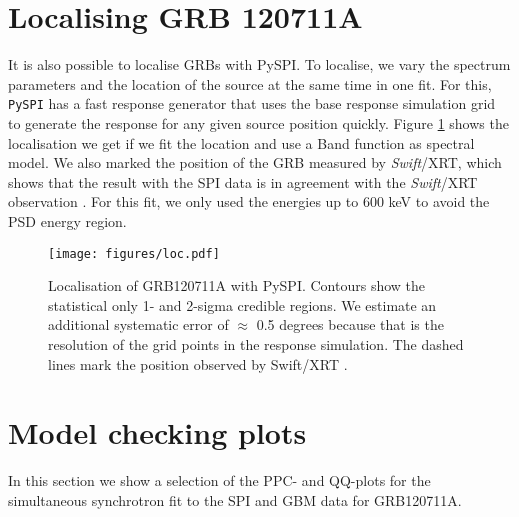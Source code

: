 \documentclass{aa}
\begin{document}
\begin{appendix}
  \section{Localising GRB 120711A}

  It is also possible to localise GRBs with PySPI. To localise, we vary the spectrum parameters and the location of the source at the same time in one fit. For this, {\tt PySPI} has a fast response generator that uses the base response simulation grid to generate the response for any given source position quickly. Figure \ref{fig:localization} shows the localisation we get if we fit the location and use a Band function as spectral model. We also marked the position of the GRB measured by \textit{Swift}/XRT, which shows that the result with the SPI data is in agreement with the \textit{Swift}/XRT observation \citep{GCN_swift}. For this fit, we only used the energies up to 600 keV to avoid the PSD energy region.

  \begin{figure}[ht]
  \begin{centering}
    \texttt{[image: figures/loc.pdf]}
    \caption{Localisation of GRB120711A with PySPI. Contours show the statistical only 1- and 2-sigma credible regions. We estimate an additional systematic error of $\approx$ 0.5 degrees because that is the resolution of the grid points in the response simulation. The dashed lines mark the position observed by Swift/XRT \citep{GCN_swift}.}
    \label{fig:localization}
  \end{centering}
\end{figure}

\onecolumn
  \section{Model checking plots}
  \label{appendix}
  In this section we show a selection of the PPC- and QQ-plots for the simultaneous synchrotron fit to the SPI and GBM data for GRB120711A.


\end{appendix}
\end{document}
